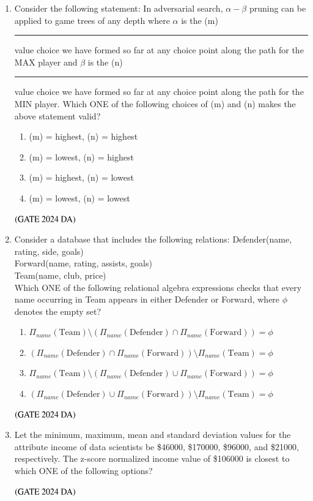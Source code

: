 \documentclass[journal,12pt,onecolumn]{IEEEtran}
\theoremstyle{remark}
\begin{document}
\begin{enumerate}[resume]
\item Consider the following statement: In adversarial search, $\alpha-\beta$ pruning can be applied to game trees of any depth where $\alpha$ is the (m)  \rule{2cm}{0.5mm} value choice we have formed so far at any choice point along the path for the MAX player and $\beta$ is the (n)  \rule{2cm}{0.5mm} value choice we have formed so far at any choice point along the path for the MIN player. Which ONE of the following choices of (m) and (n) makes the above statement valid?
\begin{multicols}{2}
\begin{enumerate}
\item (m) = highest, (n) = highest
\item (m) = lowest, (n) = highest
\item (m) = highest, (n) = lowest
\item (m) = lowest, (n) = lowest
\end{enumerate}
\end{multicols}
\hfill $\left(\text{GATE 2024 DA}\right)$


\item Consider a database that includes the following relations:
Defender(name, rating, side, goals) \\
Forward(name, rating, assists, goals) \\
Team(name, club, price) \\
Which ONE of the following relational algebra expressions checks that every name occurring in Team appears in either Defender or Forward, where $\phi$ denotes the empty set?
\begin{enumerate}
\item $\Pi_{name} (\text{Team}) \setminus (\Pi_{name} (\text{Defender}) \cap \Pi_{name} (\text{Forward})) = \phi$
\item $(\Pi_{name} (\text{Defender}) \cap \Pi_{name} (\text{Forward})) \setminus \Pi_{name} (\text{Team}) = \phi$
\item $\Pi_{name} (\text{Team}) \setminus (\Pi_{name} (\text{Defender}) \cup \Pi_{name} (\text{Forward})) = \phi$
\item $(\Pi_{name} (\text{Defender}) \cup \Pi_{name} (\text{Forward})) \setminus \Pi_{name} (\text{Team}) = \phi$
\end{enumerate}
\hfill $\left(\text{GATE 2024 DA}\right)$


\item Let the minimum, maximum, mean and standard deviation values for the attribute income of data scientists be \$46000, \$170000, \$96000, and \$21000, respectively. The z-score normalized income value of \$106000 is closest to which ONE of the following options?
\begin{enumerate}
\end{enumerate}
\hfill $\left(\text{GATE 2024 DA}\right)$



\end{enumerate}
\end{document}
